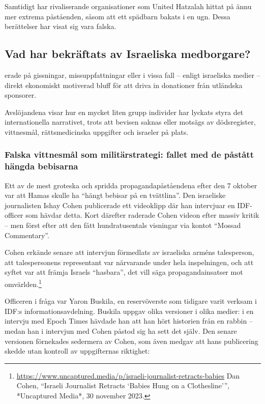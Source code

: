 \documentclass[12pt]{article}
\begin{document}
Samtidigt har rivaliserande organisationer som United Hatzalah hittat på ännu mer extrema påståenden, såsom att ett spädbarn bakats i en ugn. Dessa berättelser har visat sig vara falska.


\subsection{Vad har bekräftats av Israeliska medborgare?}
erade på gissningar, missuppfattningar eller i vissa fall – enligt israeliska medier – direkt ekonomiskt motiverad bluff för att driva in donationer från utländska sponsorer.

Avslöjandena visar hur en mycket liten grupp individer har lyckats styra det internationella narrativet, trots att bevisen saknas eller motsägs av dödsregister, vittnesmål, rättsmedicinska uppgifter och israeler på plats.

\subsubsection*{Falska vittnesmål som militärstrategi: fallet med de påstått hängda bebisarna}

Ett av de mest groteska och spridda propagandapåståendena efter den 7 oktober var att Hamas skulle ha “hängt bebisar på en tvättlina”. Den israeliske journalisten Ishay Cohen publicerade ett videoklipp där han intervjuar en IDF-officer som hävdar detta. Kort därefter raderade Cohen videon efter massiv kritik – men först efter att den fått hundratusentals visningar via kontot “Mossad Commentary”.

Cohen erkände senare att intervjun förmedlats av israeliska arméns talesperson, att talespersonens representant var närvarande under hela inspelningen, och att syftet var att främja Israels “hasbara”, det vill säga propagandainsatser mot omvärlden.\footnote{\url{https://www.uncaptured.media/p/israeli-journalist-retracts-babies} Dan Cohen, “Israeli Journalist Retracts ‘Babies Hung on a Clothesline’”, *Uncaptured Media*, 30 november 2023.}

Officeren i fråga var Yaron Buskila, en reservöverste som tidigare varit verksam i IDF:s informationsavdelning. Buskila uppgav olika versioner i olika medier: i en intervju med Epoch Times hävdade han att han hört historien från en rabbin – medan han i intervjun med Cohen påstod sig ha sett det själv. Den senare versionen förnekades sedermera av Cohen, som även medgav att hans publicering skedde utan kontroll av uppgifternas riktighet: 
\end{document}
